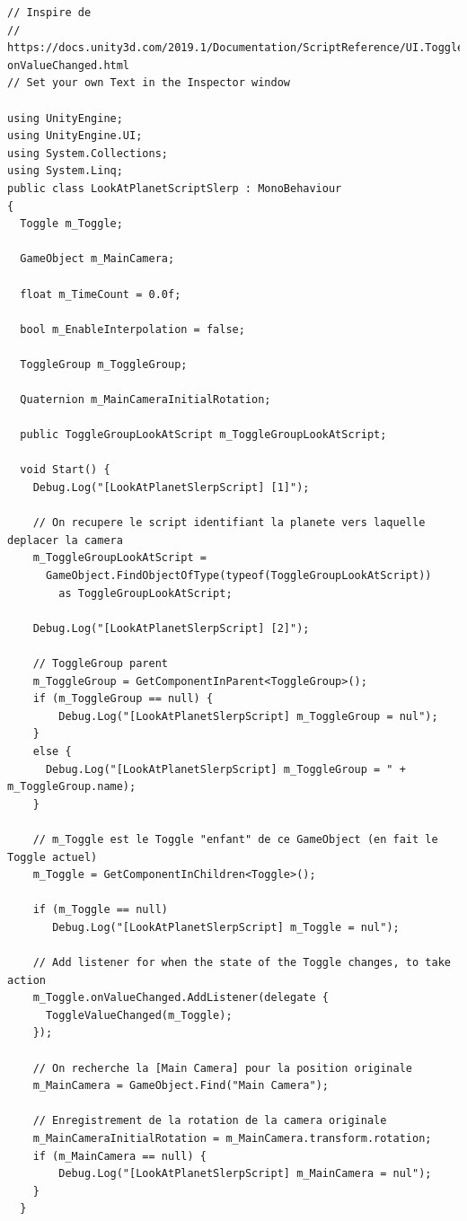 \documentclass[a4paper,10pt]{article}
\newenvironment{solution}%
{\begin{tcolorbox}[breakable,colback=red!5!white,colframe=red!75!black,title=Solution]}%
{\end{tcolorbox}}
\begin{document}
\begin{solution}
\begin{lstlisting}
// Inspire de
// https://docs.unity3d.com/2019.1/Documentation/ScriptReference/UI.Toggle-onValueChanged.html
// Set your own Text in the Inspector window

using UnityEngine;
using UnityEngine.UI;
using System.Collections;
using System.Linq;
public class LookAtPlanetScriptSlerp : MonoBehaviour
{
  Toggle m_Toggle;
	
  GameObject m_MainCamera;
	
  float m_TimeCount = 0.0f;
	
  bool m_EnableInterpolation = false;
	
  ToggleGroup m_ToggleGroup;
	
  Quaternion m_MainCameraInitialRotation;
	
  public ToggleGroupLookAtScript m_ToggleGroupLookAtScript;
	
  void Start() {
    Debug.Log("[LookAtPlanetSlerpScript] [1]");

    // On recupere le script identifiant la planete vers laquelle deplacer la camera
    m_ToggleGroupLookAtScript =
      GameObject.FindObjectOfType(typeof(ToggleGroupLookAtScript))
    	as ToggleGroupLookAtScript;
		
    Debug.Log("[LookAtPlanetSlerpScript] [2]");
				
    // ToggleGroup parent
    m_ToggleGroup = GetComponentInParent<ToggleGroup>();
    if (m_ToggleGroup == null) {
    	Debug.Log("[LookAtPlanetSlerpScript] m_ToggleGroup = nul");
    }
    else {
      Debug.Log("[LookAtPlanetSlerpScript] m_ToggleGroup = " + m_ToggleGroup.name);
    }
		
    // m_Toggle est le Toggle "enfant" de ce GameObject (en fait le Toggle actuel)
    m_Toggle = GetComponentInChildren<Toggle>();

    if (m_Toggle == null)
       Debug.Log("[LookAtPlanetSlerpScript] m_Toggle = nul");
		
    // Add listener for when the state of the Toggle changes, to take action
    m_Toggle.onValueChanged.AddListener(delegate {
      ToggleValueChanged(m_Toggle);
    });
		
    // On recherche la [Main Camera] pour la position originale
    m_MainCamera = GameObject.Find("Main Camera");
		
    // Enregistrement de la rotation de la camera originale
    m_MainCameraInitialRotation = m_MainCamera.transform.rotation;
    if (m_MainCamera == null) {
    	Debug.Log("[LookAtPlanetSlerpScript] m_MainCamera = nul");
    }
  }
	

\end{lstlisting}
\end{solution}
\end{document}
